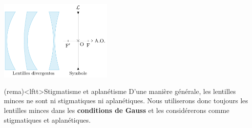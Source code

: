 \documentclass[../../main/main.tex]{subfiles}
\begin{document}
\begin{tcb*}[label=def:lents,
		list entry={\lte Lentilles et vocabulaire}
	]
\begin{isd}[sidebyside align=top]
\begin{center}
{			}{%
				\includegraphics[height=4cm]{lent_div-def}
			}%
			\label{fig:lent_conv-def}
		\end{center}
	\end{isd}
\end{tcb*}

\begin{tcb}[label=rema:lent_gauss](rema)<lftt>{Stigmatisme et aplanétisme}
	D'une manière générale, les lentilles minces ne sont ni stigmatiques ni
	aplanétiques. Nous utiliserons donc toujours les lentilles minces dans
	les \textbf{conditions de Gauss} et les considérerons comme stigmatiques
	et aplanétiques.
\end{tcb}
\vspace{-15pt}

\end{document}
